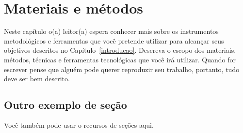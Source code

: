 \chapter{Materiais e métodos}
\label{metodologia}

Neste capítulo o(a) leitor(a) espera conhecer mais sobre os instrumentos metodológicos e ferramentas que você pretende utilizar para alcançar seus objetivos descritos no Capítulo~\ref{introducao}. Descreva o escopo dos materiais, métodos, técnicas e ferramentas tecnológicas que você irá utilizar. Quando for escrever pense que alguém pode querer reproduzir seu trabalho, portanto, tudo deve ser bem descrito.

\section{Outro exemplo de seção}

Você também pode usar o recursos de seções aqui.
